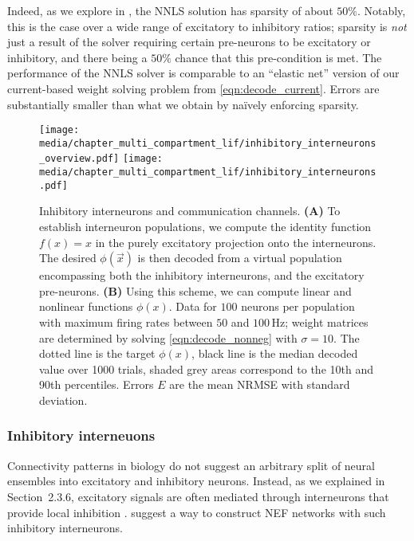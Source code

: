 Indeed, as we explore in , the NNLS solution has sparsity of about $50\%$.
Notably, this is the case over a wide range of excitatory to inhibitory ratios; sparsity is \emph{not} just a result of the solver requiring certain pre-neurons to be excitatory or inhibitory, and there being a $50\%$ chance that this pre-condition is met.
The performance of the NNLS solver is comparable to an \enquote{elastic net} version of our current-based weight solving problem from \cref{eqn:decode_current}.
Errors are substantially smaller than what we obtain by na\"ively enforcing sparsity.

\begin{figure}
	\texttt{[image: media/chapter\_multi\_compartment\_lif/inhibitory\_interneurons\_overview.pdf]}\hspace{0.4204cm}%
	\texttt{[image: media/chapter\_multi\_compartment\_lif/inhibitory\_interneurons.pdf]}%
	{\label{fig:inhibitory_interneurons_a}}%
	{\label{fig:inhibitory_interneurons_b}}%
	\caption[Inhibitory interneurons and communication channels]{Inhibitory interneurons and communication channels.
	\textbf{(A)} To establish interneuron populations, we compute the identity function $f(x) = x$ in the purely excitatory projection onto the interneurons.
	The desired $\phi(\vec x)$ is then decoded from a virtual population encompassing both the inhibitory interneurons, and the excitatory pre-neurons.
	\textbf{(B)} Using this scheme, we can compute linear and nonlinear functions $\phi(x)$.
	Data for $100$ neurons per population with maximum firing rates between $50$ and $100\,\mathrm{Hz}$; weight matrices are determined by solving \cref{eqn:decode_nonneg} with $\sigma = 10$.
	The dotted line is the target $\phi(x)$, black line is the median decoded value over 1000 trials, shaded grey areas correspond to the 10th and 90th percentiles.
	Errors $E$ are the mean NRMSE with standard deviation.
	}
\end{figure}

\subsubsection{Inhibitory interneuons}
Connectivity patterns in biology do not suggest an arbitrary split of neural ensembles into excitatory and inhibitory neurons.
Instead, as we explained in Section~2.3.6, excitatory signals are often mediated through interneurons that provide local inhibition \citep[e.g.,][Chapter~2]{kandel2012principles}.
\citet{parisien2008solving} suggest a way to 
construct NEF networks with such inhibitory interneurons.

